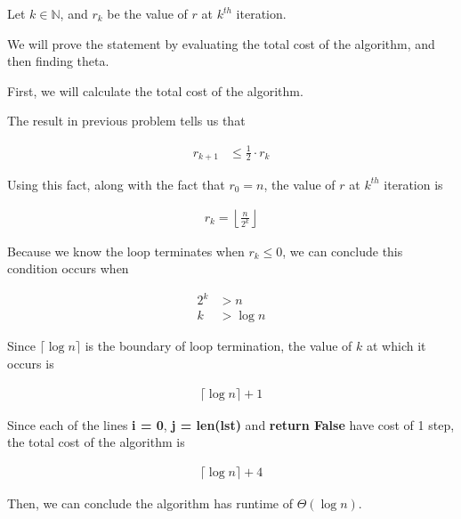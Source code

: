 \documentclass[12pt]{article}
\begin{document}
\begin{enumerate}[a.]
    Let $k \in \mathbb{N}$, and $r_k$ be the value of $r$ at $k^{th}$ iteration.

    \bigskip

    We will prove the statement by evaluating the total cost of the algorithm, and
    then finding theta.

    \bigskip

    First, we will calculate the total cost of the algorithm.

    \bigskip

    The result in previous problem tells us that

    \setcounter{equation}{0}
    \begin{align}
        r_{k+1} &\leq \frac{1}{2} \cdot r_k
    \end{align}

    \bigskip

    Using this fact, along with the fact that $r_0 = n$, the value of $r$ at $k^{th}$ iteration is

    \begin{align}
        r_k = \left\lfloor \frac{n}{2^k} \right\rfloor
    \end{align}

    \bigskip

    Because we know the loop terminates when $r_k \leq 0$, we can conclude this
    condition occurs when

    \begin{align}
        2^k &> n\\
        k &> \log n
    \end{align}

    \bigskip

    Since $\lceil \log n \rceil$ is the boundary of loop termination, the value of $k$
    at which it occurs is

    \begin{align}
        \lceil \log n \rceil + 1
    \end{align}

    \bigskip

    Since each of the lines \textbf{i = 0}, \textbf{j = len(lst)} and \textbf{return False}
    have cost of 1 step, the total cost of the algorithm is

    \begin{align}
        \lceil \log n \rceil + 4
    \end{align}

    \bigskip

    Then, we can conclude the algorithm has runtime of $\Theta(\log n)$.

\end{enumerate}
\end{document}
